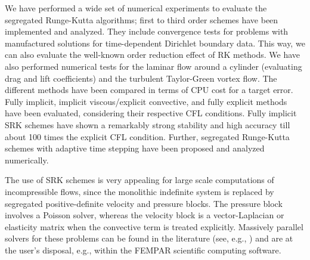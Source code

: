We have performed a wide set of numerical experiments to evaluate the segregated Runge-Kutta algorithms; first to third order schemes have been implemented and analyzed. They include convergence tests for problems with  manufactured solutions for time-dependent Dirichlet boundary data. This way, we can also evaluate the well-known order reduction effect of RK methods. We have also performed numerical tests for the laminar flow around a cylinder (evaluating drag and lift coefficients) and the turbulent Taylor-Green vortex flow. The different methods have been compared in terms of CPU cost for a target error. Fully implicit, implicit viscous/explicit convective, and fully explicit methods have been evaluated, considering their respective CFL conditions. Fully implicit SRK schemes have shown a remarkably strong stability and high accuracy till about 100 times the explicit CFL condition. Further, segregated Runge-Kutta schemes with adaptive time stepping have been proposed and analyzed numerically. 

The use of SRK schemes is very appealing for large scale computations of incompressible flows, since the monolithic indefinite system is replaced by segregated positive-definite velocity and pressure blocks. The pressure block involves a Poisson solver, whereas the velocity block is a vector-Laplacian or elasticity matrix when the convective term is treated explicitly. Massively parallel solvers for these problems can be found in the literature (see, e.g., \cite{badia_highly_2014}) and are at the user's disposal, e.g., within the FEMPAR scientific computing software.
